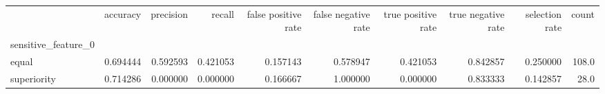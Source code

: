 \begin{tabular}{lrrrrrrrrr}
\toprule
{} &  accuracy &  precision &    recall &  false positive rate &  false negative rate &  true positive rate &  true negative rate &  selection rate &  count \\
sensitive\_feature\_0 &           &            &           &                      &                      &                     &                     &                 &        \\
\midrule
equal               &  0.694444 &   0.592593 &  0.421053 &             0.157143 &             0.578947 &            0.421053 &            0.842857 &        0.250000 &  108.0 \\
superiority         &  0.714286 &   0.000000 &  0.000000 &             0.166667 &             1.000000 &            0.000000 &            0.833333 &        0.142857 &   28.0 \\
\bottomrule
\end{tabular}
